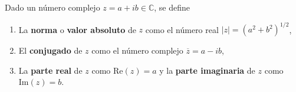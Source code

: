

\begin{definition}
Dado un número complejo $z = a + i b \in \mathbb{C}$, se define
\begin{enumerate}[label=\textnormal{(\roman*)}]
\item La \textbf{norma} o \textbf{valor absoluto} de $z$ como el número real $|z| = (a^2 + b^2)^{1/2}$,
\item El \textbf{conjugado} de $z$ como el número complejo $\overline{z} = a - i b$,
\item La \textbf{parte real} de $z$ como $\text{Re}(z) = a$ y la \textbf{parte imaginaria} de $z$ como $\text{Im}(z) = b$.
\end{enumerate}
\end{definition}
